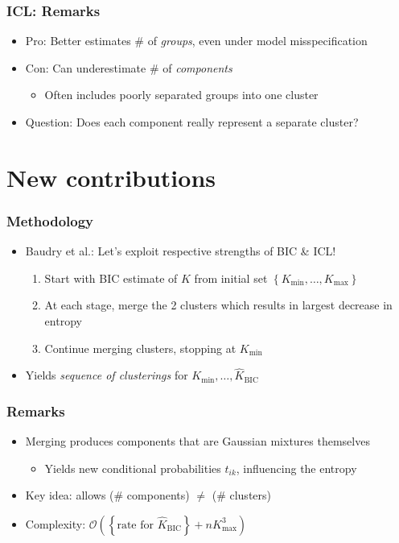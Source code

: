 \documentclass[mathserif,compress]{beamer}
\newcommand*\set[1]{\left\{#1\right\}}
\newcommand*\estim[1]{\widehat{#1}}
\renewcommand\;{\,}
\begin{document}
\begin{frame}\frametitle{ICL: Remarks}
\begin{itemize}
\item[]
\alert{Pro:} Better estimates \# of \emph{groups}, even under model misspecification
\bigskip
\item[]
\alert{Con:} Can underestimate \# of \emph{components}
\begin{itemize}
\bigskip
\item
Often includes poorly separated groups into one cluster 
\end{itemize}
\bigskip
\item[]
\alert{Question:} Does each component really represent a separate cluster? 
\end{itemize}
\end{frame}

\section{New contributions}
\begin{frame}\frametitle{Methodology}
\begin{itemize}
\item[]
\alert{Baudry et al.:}
Let's exploit respective strengths of BIC \& ICL!
\bigskip
\begin{enumerate}
\item
Start with BIC estimate of $K$ from initial set $\set{K_\text{min}, \dotsc, K_\text{max}}$
\bigskip
\item
At each stage, merge the 2 clusters which results in largest decrease in entropy
\bigskip
\item
Continue merging clusters, stopping at $K_\text{min}$
\end{enumerate} 
\bigskip
\item[]
Yields \emph{sequence of clusterings} for $K_\text{min}, \dotsc, \estim K_\text{BIC}$
\end{itemize}
\end{frame}

\begin{frame}\frametitle{Remarks}
\begin{itemize}
\item[]
Merging produces components that are \alert{Gaussian mixtures themselves}
\begin{itemize}
\bigskip
\item
Yields new conditional probabilities $t_{ik}$, influencing the entropy
\end{itemize}
\bigskip
\item[]
\alert{Key idea:} allows (\# components) $\ne$ (\# clusters)
\bigskip
\item[]
Complexity: $\mathcal O \left( \left\{\text{rate for } \estim K_\text{BIC} \right\}+ n K_\text{max}^3 \right)$
\end{itemize}
\end{frame}
\end{document}
